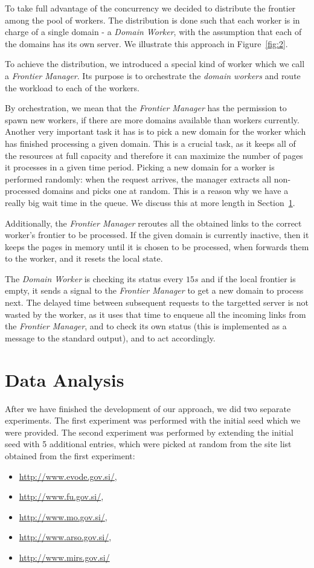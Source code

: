 \documentclass{article}
\begin{document}
To take full advantage of the concurrency we decided to distribute the frontier among the pool of workers. The distribution is done such that each worker is in charge of a single domain - a \textit{Domain Worker}, with the assumption that each of the domains has its own server. We illustrate this approach in Figure~\ref{fig:2}.

To achieve the distribution, we introduced a special kind of worker which we call a \textit{Frontier Manager}. Its purpose is to orchestrate the \textit{domain workers} and route the workload to each of the workers. 

By orchestration, we mean that the \textit{Frontier Manager} has the permission to spawn new workers, if there are more domains available than workers currently. Another very important task it has is to pick a new domain for the worker which has finished processing a given domain. This is a crucial task, as it keeps all of the resources at full capacity and therefore it can maximize the number of pages it processes in a given time period. Picking a new domain for a worker is performed randomly: when the request arrives, the manager extracts all non-processed domains and picks one at random. This is a reason why we have a really big wait time in the queue. We discuss this at more length in Section~\ref{sec:analysis}.

Additionally, the \textit{Frontier Manager} reroutes all the obtained links to the correct worker's frontier to be processed. If the given domain is currently inactive, then it keeps the pages in memory until it is chosen to be processed, when forwards them to the worker, and it resets the local state.

The \textit{Domain Worker} is checking its status every $15s$ and if the local frontier is empty, it sends a signal to the \textit{Frontier Manager} to get a new domain to process next. The delayed time between subsequent requests to the targetted server is not wasted by the worker, as it uses that time to enqueue all the incoming links from the \textit{Frontier Manager}, and to check its own status (this is implemented as a message to the standard output), and to act accordingly.


\section{Data Analysis}\label{sec:analysis}

After we have finished the development of our approach, we did two separate experiments. The first experiment was performed with the initial seed which we were provided. The second experiment was performed by extending the initial seed with 5 additional entries, which were picked at random from the site list obtained from the first experiment:
\begin{itemize}
	\item \url{http://www.evode.gov.si/},
	\item \url{http://www.fu.gov.si/},
	\item \url{http://www.mo.gov.si/},
	\item \url{http://www.arso.gov.si/},
	\item \url{http://www.mirs.gov.si/}
\end{itemize}
\end{document}
